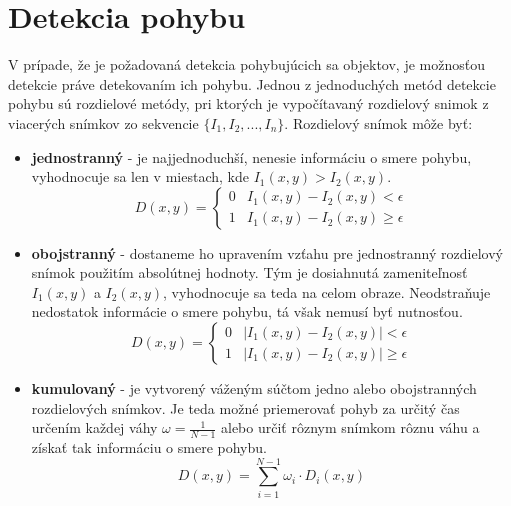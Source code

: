 \section{Detekcia pohybu}

    V prípade, že je požadovaná detekcia pohybujúcich sa objektov, je možnosťou detekcie práve detekovaním ich pohybu. Jednou z jednoduchých metód detekcie pohybu sú rozdielové metódy, pri ktorých je vypočítavaný rozdielový snimok z viacerých snímkov zo sekvencie $\{I_1, I_2, ..., I_n\}$. Rozdielový snímok môže byť:

    \begin{itemize}
        \item \textbf{jednostranný} - je najjednoduchší, nenesie informáciu o smere pohybu, vyhodnocuje sa len v miestach, kde $I_1(x,y) > I_2(x,y)$.
        \begin{equation}
            D(x,y) = \begin{cases}
                0 & I_1(x,y) - I_2(x,y) < \epsilon \\
                1 & I_1(x,y) - I_2(x,y) \geq \epsilon
            \end{cases}
        \end{equation}

        \item \textbf{obojstranný} - dostaneme ho upravením vzťahu pre jednostranný rozdielový snímok  použitím absolútnej hodnoty. Tým je dosiahnutá zameniteľnosť $I_1(x,y)$ a $I_2(x,y)$, vyhodnocuje sa teda na celom obraze. Neodstraňuje nedostatok informácie o smere pohybu, tá však nemusí byť nutnosťou.
        \begin{equation}
            D(x,y) = \begin{cases}
                0 & |I_1(x,y) - I_2(x,y)| < \epsilon \\
                1 & |I_1(x,y) - I_2(x,y)| \geq \epsilon
            \end{cases}
        \end{equation}

        \item \textbf{kumulovaný} - je vytvorený váženým súčtom jedno alebo obojstranných rozdielových snímkov. Je teda možné priemerovať pohyb za určitý čas určením každej váhy $\omega = \frac{1}{N-1}$ alebo určiť rôznym snímkom rôznu váhu a získať tak informáciu o smere pohybu.
        \begin{equation}
            D(x,y) = \sum_{i=1}^{N-1}\omega_i \cdot D_i(x,y)
        \end{equation}
    \end{itemize}


